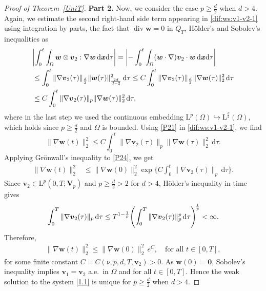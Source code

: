 \documentclass[12pt,reqno]{amsart}
\numberwithin{equation}{section}
\let\originalleft\left
\let\originalright\right
\renewcommand{\left}{\mathopen{}\mathclose\bgroup\originalleft}
\renewcommand{\right}{\aftergroup\egroup\originalright}
\theoremstyle{definition}
\def\d{\mathrm{d}}
\def\div{\operatorname{div}}
\def\L{\mathrm{L}}
\def\w{\boldsymbol{w}}
\def\x{\boldsymbol{x}}
\def\bfV{\mathbf{V}}
\begin{document}
{{\begin{proof}[Proof of Theorem~\ref{UniT}]
\vspace{2mm}
\noindent
\textbf{Part 2.} Now, we consider the case $p\geq \frac{d}{2}$ when $d> 4$.
Again, we estimate the second right-hand side term appearing
in \eqref{dif:ws:v1-v2-1} using integration by parts, the fact
that $\div\w=0$ in $Q_T$, H\"older's and Sobolev's inequalities as
\begin{align}\label{P21}\nonumber
    & \left|\int_0^t \int_\Omega \boldsymbol{w} \otimes \boldsymbol{v}_2
    : \nabla \boldsymbol{w}\,\d\x\d\tau\right|
    =
    \left|-\int_0^t \int_\Omega (\boldsymbol{w}\cdot\nabla)
    \boldsymbol{v}_2\cdot\boldsymbol{w}\,\d\x\d\tau \right|
    \\& \leq  \nonumber
    \int_0^t \|\nabla\boldsymbol{v}_2(\tau) \|_{\frac{d}{2}}
    \|\boldsymbol{w}(\tau) \|_{\frac{2d}{d-2}}^2 \, \d\tau
  \leq
    C \int_0^t \|\nabla\boldsymbol{v}_2(\tau) \|_{\frac{d}{2}}
    \|\nabla \boldsymbol{w}(\tau) \|_{2}^2 \, \d\tau
    \\& \leq 
    C \int_0^t \|\nabla\boldsymbol{v}_2(\tau) \|_{p}
    \|\nabla \boldsymbol{w}(\tau) \|_{2}^2 \, \d\tau,
\end{align}
where in the last step we used the continuous embedding
$\L^p(\Omega)\hookrightarrow \L^{\frac{d}{2}}(\Omega)$,
which holds since $p\geq \frac{d}{2}$ and $\Omega$ is bounded.
Using \eqref{P21} in \eqref{dif:ws:v1-v2-1}, we find
\begin{equation}\label{P24}
    \|\nabla \w(t)\|_{2}^2 \leq
    C\int_0^t\|\nabla \boldsymbol{v}_2(\tau)\|_{p}
    \|\nabla\boldsymbol{w}(\tau) \|_2^2 \, \d\tau.
\end{equation}
Applying Gr\"onwall's inequality to \eqref{P24}, we get
\begin{align*}
    \|\nabla \boldsymbol{w}(t)\|_2^2
    &\leq \|\nabla \boldsymbol{w}(0)\|_2^2
    \exp \bigg\{ C\int_0^t \|\nabla \boldsymbol{v}_2(\tau)\|_{p}
    \, \d\tau \bigg\}.
\end{align*}
Since $\boldsymbol{v}_2 \in \L^p(0,T;\bfV_p)$ and
$p \geq \frac{d}{2} > 2$ for $d > 4$, H\"older's inequality
in time gives
\begin{align*}
    \int_0^T \|\nabla \boldsymbol{v}_2(\tau)\|_{p} \, \d\tau
    \leq T^{1 - \frac{1}{p}}
    \left( \int_0^T \|\nabla \boldsymbol{v}_2(\tau)\|_{p}^{p}
    \, \d\tau \right)^{\!\frac{1}{p}}
    < \infty.
\end{align*}
Therefore,
\begin{align*}
    \|\nabla \boldsymbol{w}(t)\|_2^2
    \leq \|\nabla \boldsymbol{w}(0)\|_2^2 \, e^{C},
    \quad \text{for all } t \in [0,T],
\end{align*}
for some finite constant $C = C(\nu, p, d, T, \boldsymbol{v}_2) > 0$.
As $\boldsymbol{w}(0)=\boldsymbol{0}$, Sobolev's inequality implies
$\boldsymbol{v}_1=\boldsymbol{v}_2$ a.e.\ in $\Omega$ and for all
$t\in [0,T]$.
Hence the weak solution to the system \eqref{1.1}
is unique for $p\geq \frac{d}{2}$ when $d>4$.
\end{proof}


}}
\end{document}

